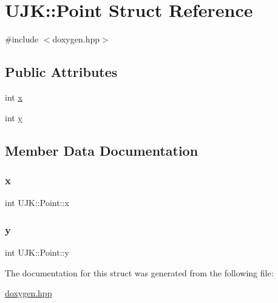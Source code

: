 \hypertarget{struct_u_j_k_1_1_point}{}\section{U\+JK\+::Point Struct Reference}
\label{struct_u_j_k_1_1_point}


{\ttfamily \#include $<$doxygen.\+hpp$>$}

\subsection*{Public Attributes}
\begin{DoxyCompactItemize}
\item 
int \mbox{\hyperlink{struct_u_j_k_1_1_point_a0689a44726f9014867fb5b80e6efc6e4}{x}}
\item 
int \mbox{\hyperlink{struct_u_j_k_1_1_point_afb4c8e1bb2911113e9df70a82740dda2}{y}}
\end{DoxyCompactItemize}


\subsection{Member Data Documentation}
\mbox{\label{struct_u_j_k_1_1_point_a0689a44726f9014867fb5b80e6efc6e4}} 
\subsubsection{\texorpdfstring{x}{x}}
{\footnotesize\ttfamily int U\+J\+K\+::\+Point\+::x}

\mbox{\label{struct_u_j_k_1_1_point_afb4c8e1bb2911113e9df70a82740dda2}} 
\subsubsection{\texorpdfstring{y}{y}}
{\footnotesize\ttfamily int U\+J\+K\+::\+Point\+::y}



The documentation for this struct was generated from the following file\+:\begin{DoxyCompactItemize}
\item 
\mbox{\hyperlink{doxygen_8hpp}{doxygen.\+hpp}}\end{DoxyCompactItemize}
